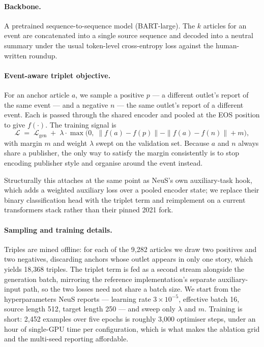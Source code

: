 \documentclass[10pt,twocolumn,a4paper]{article}
\begin{document}
\paragraph{Backbone.} A pretrained sequence-to-sequence model (BART-large). The
$k$ articles for an event are concatenated into a single source sequence and
decoded into a neutral summary under the usual token-level cross-entropy loss
against the human-written roundup.

\paragraph{Event-aware triplet objective.} For an anchor article $a$, we sample a
positive $p$ --- a different outlet's report of the same event --- and a negative
$n$ --- the same outlet's report of a different event. Each is passed through the
shared encoder and pooled at the EOS position to give $f(\cdot)$. The training
signal is
\[
\mathcal{L} \;=\; \mathcal{L}_{\text{gen}} \;+\; \lambda \cdot
\max\!\big(0,\; \|f(a)-f(p)\| - \|f(a)-f(n)\| + m \big),
\]
with margin $m$ and weight $\lambda$ swept on the validation set. Because $a$ and
$n$ always share a publisher, the only way to satisfy the margin consistently is
to stop encoding publisher style and organise around the event instead.

Structurally this attaches at the same point as NeuS's own auxiliary-task hook,
which adds a weighted auxiliary loss over a pooled encoder state; we replace
their binary classification head with the triplet term and reimplement on a
current transformers stack rather than their pinned 2021 fork.

\paragraph{Sampling and training details.} Triples are mined offline: for each of
the 9{,}282 articles we draw two positives and two negatives, discarding anchors
whose outlet appears in only one story, which yields 18{,}368 triples. The
triplet term is fed as a second stream alongside the generation batch, mirroring
the reference implementation's separate auxiliary-input path, so the two losses
need not share a batch size. We start from the hyperparameters NeuS reports ---
learning rate $3\!\times\!10^{-5}$, effective batch 16, source length 512, target
length 250 --- and sweep only $\lambda$ and $m$. Training is short: 2{,}452
examples over five epochs is roughly 3{,}000 optimiser steps, under an hour of
single-GPU time per configuration, which is what makes the ablation grid and the
multi-seed reporting affordable.
\end{document}
